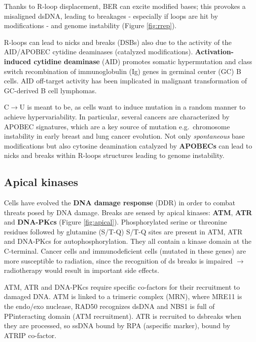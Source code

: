 Thanks to R-loop displacement, BER can excite modified bases; this provokes a misaligned dsDNA, leading to breakages - especially if loops are hit by modifications - and genome instability (Figure \ref{fig:rrep}).

R-loops can lead to nicks and breaks (DSBs) also due to the activity of the AID/APOBEC cytidine deaminases (catalyzed modifications). \textbf{Activation-induced cytidine deaminase} (AID) promotes somatic hypermutation and class switch recombination of immunoglobulin (Ig) genes in germinal center (GC) B cells. AID off-target activity has been implicated in malignant transformation of GC-derived B cell lymphomas.

C$\rightarrow$U is meant to be, as cells want to induce mutation in a random manner to achieve hypervariability. In particular, several cancers are characterized by APOBEC signatures, which are a key source of mutation e.g.~chromosome instability in early breast and lung cancer evolution. Not only \emph{spontaneous} base modifications but also cytosine deamination catalyzed by \textbf{APOBECs} can lead to nicks and breaks within R-loops structures leading to genome instability.

\hypertarget{apical-kinases}{%
\subsection{Apical kinases}\label{apical-kinases}}

Cells have evolved the \textbf{DNA damage response} (DDR) in order to combat threats
posed by DNA damage. Breaks are sensed by apical kinases: \textbf{ATM}, \textbf{ATR} and \textbf{DNA-PKcs} (Figure \ref{fig:apical}). Phosphorylated serine or threonine residues followed by glutamine (S/T-Q) S/T-Q sites are present in ATM, ATR and DNA-PKcs for autophosphorylation. They all contain a kinase domain at the C-terminal. Cancer cells and immunodeficient cells (mutated in these genes) are more susceptible to radiation, since the recognition of ds breaks is impaired $\rightarrow$ radiotherapy would result in important side effects.

ATM, ATR and DNA-PKcs require specific co-factors for their recruitment to
damaged DNA. ATM is linked to a trimeric complex (MRN), where MRE11 is the endo/exo nuclease, RAD50 recognizes dsDNA and NBS1 is full of PPinteracting domain (ATM recruitment). ATR is recruited to dsbreaks when they are processed, so ssDNA bound by RPA (aspecific marker), bound by ATRIP co-factor.

